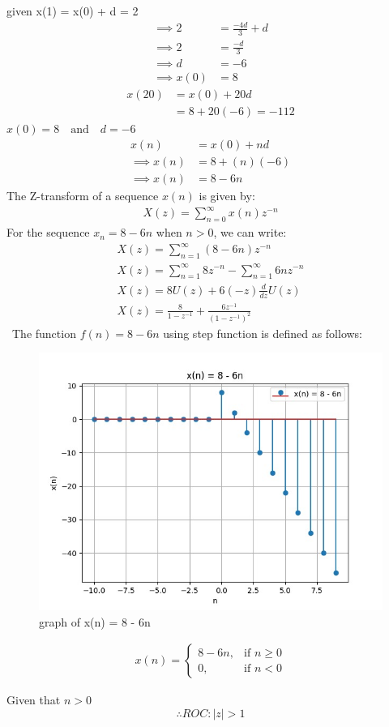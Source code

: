 \documentclass[journal,12pt,twocolumn]{IEEEtran}
\theoremstyle{remark}
\begin{document}
    given x(1) = x(0) + d = 2
    \begin{align}
        \implies 2 &= \frac{-4d}{3} +d\\
        \implies 2 &= \frac{-d}{3}\\
        \implies d &= -6\\
        \implies x(0) &= 8
    \end{align}
    \begin{align}
        x(20)&=x(0)+20d\\
        &=8+20(-6) = -112
    \end{align}
\centering
$x(0) = 8\quad \text{and}\quad d = -6$
    \begin{align}
        x(n)&=x(0)+nd\\
        \implies x(n)&=8+(n)(-6)\\
        \implies x(n)&=8-6n
    \end{align}    
The Z-transform of a sequence $x(n)$ is given by:
    \begin{align}
        X(z) = \sum_{n=0}^{\infty} x(n) z^{-n} 
    \end{align}
For the sequence $x_n = 8 - 6n$ when $n > 0$, we can write:
    \begin{align}
        X(z) = \sum_{n=1}^{\infty} (8 - 6n)z^{-n}\\
        X(z) = \sum_{n=1}^{\infty} 8z^{-n} - \sum_{n=1}^{\infty} 6nz^{-n}\\
        X(z) = 8U(z) + 6(-z)\frac{d}{dz} U(z)\\
        X(z)=\frac{8}{1-z^{-1}}+\frac{6z^{-1}}{(1-z^{-1})^{2}}
    \end{align}\
The function $f(n) = 8 - 6n$ using step function is defined as follows:
    \begin{figure}[h]
        \centering
        \includegraphics[width=0.95\linewidth]{figs/Figure_1.png}
        \caption{graph of x(n) = 8 - 6n}
        \label{8 - 6n dicrete function}
    \end{figure}
    \begin{align}
        x(n) = 
        \begin{cases}
            8 - 6n, & \text{if } n \geq 0 \\
            0, & \text{if } n < 0
        \end{cases}
    \end{align}

Given that \( n > 0 \)
\[\therefore ROC : |z| > 1\]
    
\end{document}
